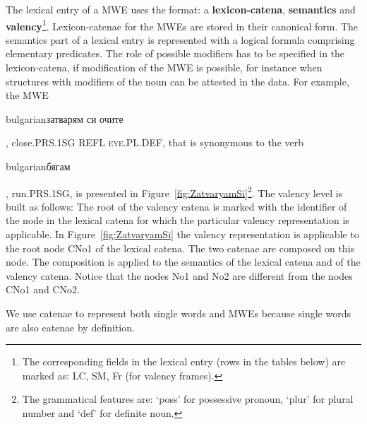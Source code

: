 \documentclass[output=paper]{langsci/langscibook}
\begin{document}
The lexical entry of a MWE uses the format: a \textbf{ lexicon-catena}, \textbf{
semantics} and \textbf{ valency}\footnote{The corresponding fields in the
lexical entry (rows in the tables below) are marked as: LC, SM, Fr (for
valency frames).}. Lexicon-catenae for the MWEs are stored in their
canonical form. The semantics part of a lexical entry is represented with a
logical formula comprising elementary predicates. The role of possible
modifiers has to be specified in the lexicon-catena, if modification of the
MWE is possible, for instance when structures with modifiers of
the noun can be attested in the data. For example, the MWE \begin{otherlanguage*}{bulgarian}затварям си
очите\end{otherlanguage*}, close.\textsc{PRS.1SG} \textsc{REFL} \textsc{eye.PL.DEF},  that is
synonymous to the verb
\begin{otherlanguage*}{bulgarian}бягам\end{otherlanguage*},
run.\textsc{PRS.1SG}, is presented in Figure~\ref{fig:ZatvaryamSi}\footnote{The
grammatical features are: `poss' for possessive pronoun, `plur' for plural
number and `def' for definite noun.}. The valency level is built as follows:
The root of the valency catena is marked with the identifier of the node in
the lexical catena for which the particular valency representation is
applicable. In Figure~\ref{fig:ZatvaryamSi} the valency representation is
applicable to the root node CNo1 of the lexical catena. The two catenae are
composed on this node. The composition is applied to the semantics of the
lexical catena and of the valency catena.  Notice that the nodes No1 and No2
are different from the nodes CNo1 and CNo2.

We use catenae to represent both single words and MWEs because single words
are also catenae by definition.
\end{document}
